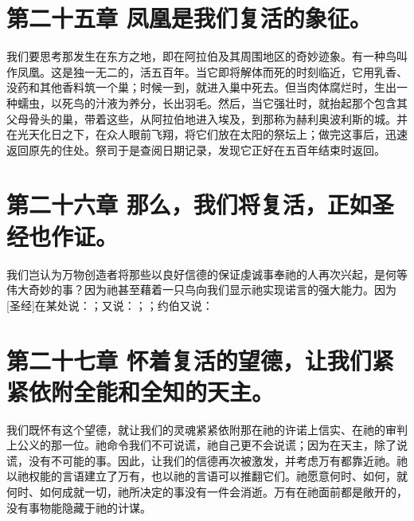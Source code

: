 \section{第二十五章 凤凰是我们复活的象征。}

我们要思考那发生在东方之地，即在阿拉伯及其周围地区的奇妙迹象。有一种鸟叫作凤凰。这是独一无二的，活五百年。当它即将解体而死的时刻临近，它用乳香、没药和其他香料筑一个巢；时候一到，就进入巢中死去。但当肉体腐烂时，生出一种蠕虫，以死鸟的汁液为养分，长出羽毛。然后，当它强壮时，就抬起那个包含其父母骨头的巢，带着这些，从阿拉伯地进入埃及，到那称为赫利奥波利斯的城。并在光天化日之下，在众人眼前飞翔，将它们放在太阳的祭坛上；做完这事后，迅速返回原先的住处。祭司于是查阅日期记录，发现它正好在五百年结束时返回。\par


\section{第二十六章 那么，我们将复活，正如圣经也作证。}

我们岂认为万物创造者将那些以良好信德的保证虔诚事奉祂的人再次兴起，是何等伟大奇妙的事？因为祂甚至藉着一只鸟向我们显示祂实现诺言的强大能力。因为[圣经]在某处说：；又说：；；约伯又说：\par


\section{第二十七章 怀着复活的望德，让我们紧紧依附全能和全知的天主。}

我们既怀有这个望德，就让我们的灵魂紧紧依附那在祂的许诺上信实、在祂的审判上公义的那一位。祂命令我们不可说谎，祂自己更不会说谎；因为在天主，除了说谎，没有不可能的事。因此，让我们的信德再次被激发，并考虑万有都靠近祂。祂以祂权能的言语建立了万有，也以祂的言语可以推翻它们。祂愿意何时、如何，就何时、如何成就一切，祂所决定的事没有一件会消逝。万有在祂面前都是敞开的，没有事物能隐藏于祂的计谋。\par

